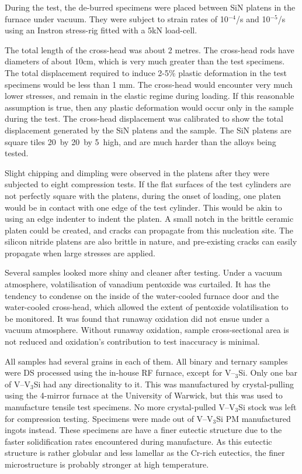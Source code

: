 During the test, the de-burred specimens were placed between SiN platens in the furnace under vacuum.  They were subject to strain rates of 10$^{-4}$/s and 10$^{-5}$/s using an Instron stress-rig fitted with a 5kN load-cell. 

The total length of the cross-head was about 2 metres.  The cross-head rods have diameters of about 10cm, which is very much greater than the test specimens.  The total displacement required to induce 2-5\% plastic deformation in the test specimens would be less than 1 mm.  The cross-head would encounter very much lower stresses, and remain in the elastic regime during loading.  If this reasonable assumption is true, then any plastic deformation would occur only in the sample during the test.  The cross-head displacement was calibrated to show the total displacement generated by the SiN platens and the sample.  The SiN platens are square tiles 20\milli\metre\ by 20\milli\metre\ by 5\milli\metre\ high, and are much harder than the alloys being tested. 

Slight chipping and dimpling were observed in the platens after they were subjected to eight compression tests.  If the flat surfaces of the test cylinders are not perfectly square with the platens, during the onset of loading, one platen would be in contact with one edge of the test cylinder.  This would be akin to using an edge indenter to indent the platen.  A small notch in the brittle ceramic platen could be created, and cracks can propagate from this nucleation site.  The silicon nitride platens are also brittle in nature, and pre-existing cracks can easily propagate when large stresses are applied.

Several samples looked more shiny and cleaner after testing. Under a vacuum atmosphere, volatilisation of vanadium pentoxide was curtailed.  It has the tendency to condense on the inside of the water-cooled furnace door and the water-cooled cross-head, which allowed the extent of pentoxide volatilisation to be monitored.  It was found that runaway oxidation did not ensue under a vacuum atmosphere.  Without runaway oxidation, sample cross-sectional area is not reduced and oxidation’s contribution to test inaccuracy is minimal.

All samples had several grains in each of them.  All binary and ternary samples were DS processed using the in-house RF furnace, except for V--$_3$Si.  Only one bar of V--V$_3$Si had any directionality to it. This was manufactured by crystal-pulling using the 4-mirror furnace at the University of Warwick, but this was used to manufacture tensile test specimens.  No more crystal-pulled V--V$_3$Si stock was left for compression testing.  Specimens were made out of V--V$_3$Si PM manufactured ingots instead.  These specimens are have a finer eutectic structure due to the faster solidification rates encountered during manufacture.  As this eutectic structure is rather globular and less lamellar as the Cr-rich eutectics, the finer microstructure is probably stronger at high temperature. 

